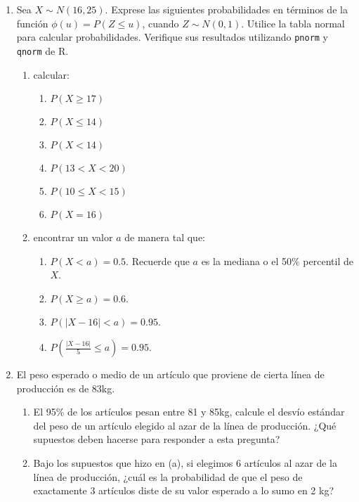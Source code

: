 \documentclass[a4paper, 11pt]{article}
\begin{document}
\begin{enumerate}
    \item Sea $X \sim N(16, 25)$. Exprese las siguientes probabilidades en términos de la función $\phi(u) = P(Z \leq u)$, cuando $Z \sim N(0, 1)$. Utilice la tabla normal para calcular probabilidades. Verifique sus resultados utilizando \texttt{pnorm} y \texttt{qnorm} de R.
    \begin{enumerate}
        \item calcular:
        \begin{enumerate}
            \item $P(X \geq 17)$
            \item $P(X \leq 14)$
            \item $P(X < 14)$
            \item $P(13 < X < 20)$
            \item $P(10 \leq X < 15)$
            \item $P(X = 16)$
        \end{enumerate}
        \item encontrar un valor $a$ de manera tal que:
        \begin{enumerate}
            \item $P(X < a) = 0.5$. Recuerde que $a$ es la mediana o el 50\% percentil de $X$.
            \item $P(X \geq a) = 0.6$.
            \item $P(|X - 16| < a) = 0.95$.
            \item $P\left(\frac{|X-16|}{5} \leq a\right) = 0.95$.
        \end{enumerate}
    \end{enumerate}
    
    \item El peso esperado o medio de un artículo que proviene de cierta línea de producción es de 83kg.
    \begin{enumerate}
        \item El 95\% de los artículos pesan entre 81 y 85kg, calcule el desvío estándar del peso de un artículo elegido al azar de la línea de producción. ¿Qué supuestos deben hacerse para responder a esta pregunta?
        \item Bajo los supuestos que hizo en (a), si elegimos 6 artículos al azar de la línea de producción, ¿cuál es la probabilidad de que el peso de exactamente 3 artículos diste de su valor esperado a lo sumo en 2 kg?
    \end{enumerate}
    

\end{enumerate}
\end{document}
